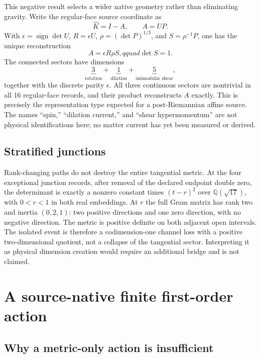 \documentclass[11pt]{article}
\theoremstyle{definition}
\theoremstyle{remark}
\begin{document}
This negative result selects a wider native geometry rather than eliminating gravity. Write the regular-face source coordinate as
\begin{equation}\label{eq:polar}
 \widehat K=I-A,\qquad A=UP.
\end{equation}
With $\epsilon=\operatorname{sign}\det U$, $R=\epsilon U$, $\rho=(\det P)^{1/3}$, and $S=\rho^{-1}P$, one has the unique reconstruction
\begin{equation}\label{eq:hypermomentum}
 A=\epsilon R\rho S,qquad \det S=1.
\end{equation}
The connected sectors have dimensions
\begin{equation}\label{eq:315}
 \underbrace{3}_{\text{rotation}}
 +\underbrace{1}_{\text{dilation}}
 +\underbrace{5}_{\text{unimodular shear}},
\end{equation}
together with the discrete parity $\epsilon$. All three continuous sectors are nontrivial in all 16 regular-face records, and their product reconstructs $A$ exactly. This is precisely the representation type expected for a post-Riemannian affine source. The names ``spin,'' ``dilation current,'' and ``shear hypermomentum'' are not physical identifications here; no matter current has yet been measured or derived.

\subsection{Stratified junctions}

Rank-changing paths do not destroy the entire tangential metric. At the four exceptional junction records, after removal of the declared endpoint double zero, the determinant is exactly a nonzero constant times $(t-r)^2$ over $\mathbb Q(\sqrt{17})$, with $0<r<1$ in both real embeddings. At $r$ the full Gram matrix has rank two and inertia $(0,2,1)$: two positive directions and one zero direction, with no negative direction. The metric is positive definite on both adjacent open intervals. The isolated event is therefore a codimension-one channel loss with a positive two-dimensional quotient, not a collapse of the tangential sector. Interpreting it as physical dimension creation would require an additional bridge and is not claimed.

\section{A source-native finite first-order action}

\subsection{Why a metric-only action is insufficient}
\end{document}
